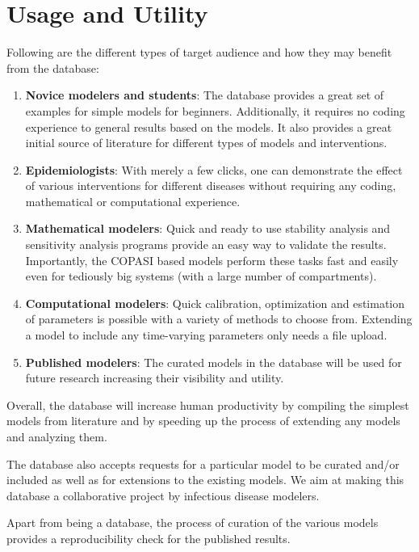 \documentclass{article}
\begin{document}
\section{Usage and Utility }
Following are the different types of target audience and how they may benefit from the database:
\begin{enumerate}
    \item \textbf{Novice modelers and students}: The database provides a great set of examples for simple models for beginners. Additionally, it requires no coding experience to general results based on the models. It also provides a great initial source of literature for different types of models and interventions.
    \item \textbf{Epidemiologists}: With merely a few clicks, one can demonstrate the effect of various interventions for different diseases without requiring any coding, mathematical or computational experience.
    \item \textbf{Mathematical modelers}: Quick and ready to use stability analysis and sensitivity analysis programs provide an easy way to validate the results. Importantly, the COPASI based models perform these tasks fast and easily even for tediously big systems (with a large number of compartments).
    \item \textbf{Computational modelers}: Quick calibration, optimization and estimation of parameters is possible with a variety of methods to choose from. Extending a model to include any time-varying parameters only needs a file upload. 
    \item \textbf{Published modelers}: The curated models in the database will be used for future research increasing their visibility and utility.
\end{enumerate}

Overall, the database will increase human productivity by compiling the simplest models from literature and by speeding up the process of extending any models and analyzing them.

The database also accepts requests for a particular model to be curated and/or included as well as for extensions to the existing models. We aim at making this database a collaborative project by infectious disease modelers.

Apart from being a database, the process of curation of the various models provides a reproducibility check for the published results.
\end{document}
